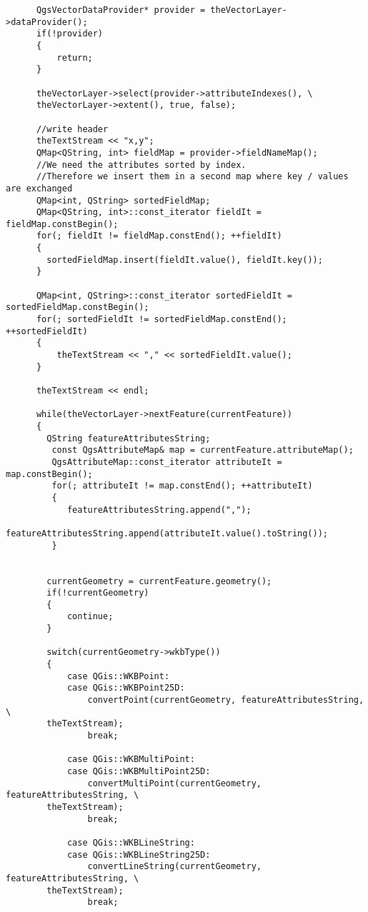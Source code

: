\begin{verbatim}
      QgsVectorDataProvider* provider = theVectorLayer->dataProvider();
      if(!provider)
      {
          return;
      }

      theVectorLayer->select(provider->attributeIndexes(), \
      theVectorLayer->extent(), true, false);

      //write header
      theTextStream << "x,y";
      QMap<QString, int> fieldMap = provider->fieldNameMap();
      //We need the attributes sorted by index.
      //Therefore we insert them in a second map where key / values are exchanged
      QMap<int, QString> sortedFieldMap;
      QMap<QString, int>::const_iterator fieldIt = fieldMap.constBegin();
      for(; fieldIt != fieldMap.constEnd(); ++fieldIt)
      {
        sortedFieldMap.insert(fieldIt.value(), fieldIt.key());
      }

      QMap<int, QString>::const_iterator sortedFieldIt = sortedFieldMap.constBegin();
      for(; sortedFieldIt != sortedFieldMap.constEnd(); ++sortedFieldIt)
      {
          theTextStream << "," << sortedFieldIt.value();
      }

      theTextStream << endl;

      while(theVectorLayer->nextFeature(currentFeature))
      {
        QString featureAttributesString;
         const QgsAttributeMap& map = currentFeature.attributeMap();
         QgsAttributeMap::const_iterator attributeIt = map.constBegin();
         for(; attributeIt != map.constEnd(); ++attributeIt)
         {
            featureAttributesString.append(",");
            featureAttributesString.append(attributeIt.value().toString());
         }


        currentGeometry = currentFeature.geometry();
        if(!currentGeometry)
        {
            continue;
        }

        switch(currentGeometry->wkbType())
        {
            case QGis::WKBPoint:
            case QGis::WKBPoint25D:
                convertPoint(currentGeometry, featureAttributesString, \
		theTextStream);
                break;

            case QGis::WKBMultiPoint:
            case QGis::WKBMultiPoint25D:
                convertMultiPoint(currentGeometry, featureAttributesString, \
		theTextStream);
                break;

            case QGis::WKBLineString:
            case QGis::WKBLineString25D:
                convertLineString(currentGeometry, featureAttributesString, \
		theTextStream);
                break;


\end{verbatim}
